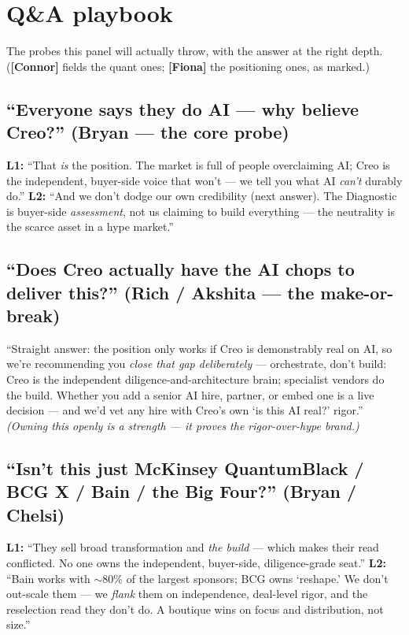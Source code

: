 \documentclass[11pt]{article}
\newcommand{\F}{\textcolor{creoaccent}{\textbf{[Fiona]}}}
\newcommand{\C}{\textcolor{creonavy}{\textbf{[Connor]}}}
\begin{document}
\section{Q\&A playbook}
The probes this panel will actually throw, with the answer at the right depth. (\C{} fields the
quant ones; \F{} the positioning ones, as marked.)

\subsection{``Everyone says they do AI --- why believe Creo?'' \textnormal{(Bryan --- the core probe)}}
\textbf{L1:} ``That \emph{is} the position. The market is full of people overclaiming AI; Creo is
the independent, buyer-side voice that won't --- we tell you what AI \emph{can't} durably do.''
\textbf{L2:} ``And we don't dodge our own credibility (next answer). The Diagnostic is buyer-side
\emph{assessment}, not us claiming to build everything --- the neutrality is the scarce asset in a
hype market.''

\subsection{``Does Creo actually have the AI chops to deliver this?'' \textnormal{(Rich / Akshita --- the make-or-break)}}
``Straight answer: the position only works if Creo is demonstrably real on AI, so we're
recommending you \emph{close that gap deliberately} --- orchestrate, don't build: Creo is the
independent diligence-and-architecture brain; specialist vendors do the build. Whether you add a
senior AI hire, partner, or embed one is a live decision --- and we'd vet any hire with Creo's
own `is this AI real?' rigor.'' \emph{(Owning this openly is a strength --- it proves the
rigor-over-hype brand.)}

\subsection{``Isn't this just McKinsey QuantumBlack / BCG X / Bain / the Big Four?'' \textnormal{(Bryan / Chelsi)}}
\textbf{L1:} ``They sell broad transformation and \emph{the build} --- which makes their read
conflicted. No one owns the independent, buyer-side, diligence-grade seat.'' \textbf{L2:} ``Bain
works with $\sim$80\% of the largest sponsors; BCG owns `reshape.' We don't out-scale them --- we
\emph{flank} them on independence, deal-level rigor, and the reselection read they don't do. A
boutique wins on focus and distribution, not size.''
\end{document}
